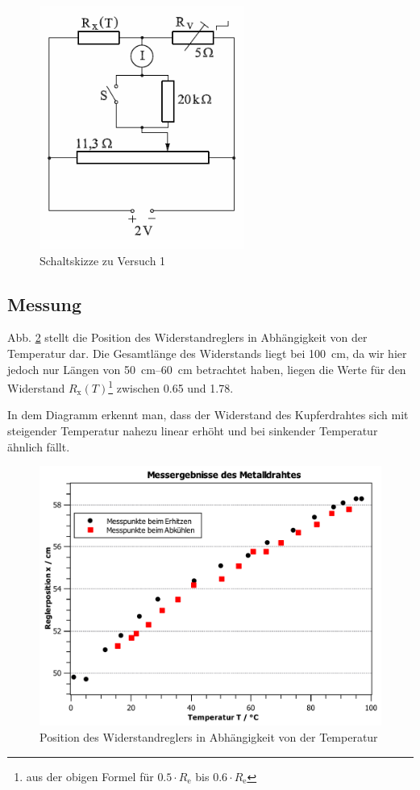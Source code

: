 \documentclass[11pt,a4paper,titlepage, ngerman]{article}
\begin{document}
			\begin{figure}
				\centering
				\includegraphics[width=0.6\textwidth]{Versuch2.png}
				\caption{Schaltskizze zu Versuch 1}
				\label{Schaltskizze2}
			\end{figure}
		
		\subsection{Messung}
			
			Abb. \ref{Ölbad} stellt die Position des Widerstandreglers in Abhängigkeit von der Temperatur dar. Die Gesamtlänge des Widerstands liegt bei \SI{100}{cm}, da wir hier jedoch nur Längen von \SIrange{50}{60}{cm} betrachtet haben, liegen die Werte für den Widerstand $R_\text{x}(T)$\footnote{aus der obigen Formel für $0.5\cdot R_\text{e}$ bis $0.6\cdot R_\text{e}$} zwischen \SI{0,65}{\Omega} und \SI{1,78}{\Omega}.
			
			In dem Diagramm erkennt man, dass der Widerstand des Kupferdrahtes sich mit steigender Temperatur nahezu linear erhöht und bei sinkender Temperatur ähnlich fällt.
			
			\begin{figure}
				\centering
				\includegraphics[width=\textwidth]{MessungDraht.pdf}
				\caption{Position des Widerstandreglers in Abhängigkeit von der Temperatur}
				\label{Ölbad}
			\end{figure}
			
\end{document}
